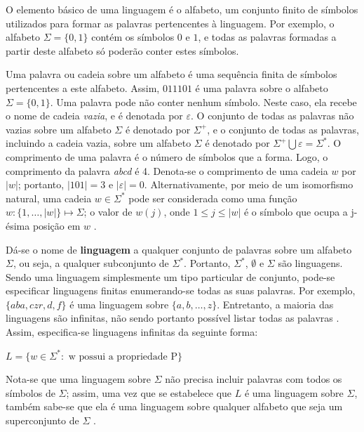 \documentclass[12pt,a4paper]{article}
\begin{document}
O elemento básico de uma linguagem é o alfabeto, um conjunto finito de símbolos
utilizados para formar as palavras pertencentes à linguagem. Por exemplo, o
alfabeto $\Sigma = \{0,1\}$ contém os símbolos $0$ e $1$, e todas as palavras
formadas a partir deste alfabeto só poderão conter estes símbolos.

Uma palavra ou cadeia sobre um alfabeto é uma sequência finita de símbolos
pertencentes a este alfabeto. Assim, $011101$ é uma palavra sobre o alfabeto
$\Sigma = \{0, 1\}$. Uma palavra pode não conter nenhum símbolo. Neste caso,
ela recebe o nome de cadeia \textit{vazia}, e é denotada por $\varepsilon$.
O conjunto de todas as palavras não vazias sobre um alfabeto $\Sigma$ é
denotado por $\Sigma^+$, e o conjunto de todas as palavras, incluindo
a cadeia vazia, sobre um alfabeto $\Sigma$ é denotado por
${\Sigma}^+ \bigcup \varepsilon = \Sigma^*$. O comprimento de uma palavra
é o número de símbolos que a forma. Logo, o comprimento da palavra
\emph{abcd} é 4. Denota-se o comprimento de uma cadeia $w$ por
$|w|$; portanto, $|101| = 3$ e $|\varepsilon| = 0$. Alternativamente,
por meio de um isomorfismo natural, uma cadeia $w \in \Sigma^*$ pode ser
considerada como uma função $w: \{1,\ldots,|w|\} \mapsto \Sigma$; o
valor de $w(j)$, onde $1 \le j \le |w|$ é o símbolo que ocupa a j-ésima
posição em $w$ .

Dá-se o nome de \textbf{linguagem} a qualquer conjunto de palavras sobre um
alfabeto $\Sigma$, ou seja, a qualquer subconjunto de $\Sigma^*$. Portanto,
$\Sigma^*$, $\emptyset$ e $\Sigma$ são linguagens. Sendo uma linguagem 
simplesmente um tipo particular de conjunto, pode-se especificar linguagens
finitas enumerando-se todas as suas palavras. Por exemplo, $\{aba, czr, d, f\}$
é uma linguagem sobre $\{a, b, \ldots, z\}$. Entretanto, a maioria das
linguagens são infinitas, não sendo portanto possível listar todas as palavras
. Assim, especifica-se linguagens infinitas da seguinte forma:

\begin{center}
$L = \{w \in \Sigma^*: \mbox{ w possui a propriedade P}\}$
\end{center}

Nota-se que uma linguagem sobre $\Sigma$ não precisa incluir palavras com todos
os símbolos de $\Sigma$; assim, uma vez que se estabelece que $L$ é uma
linguagem sobre $\Sigma$, também sabe-se que ela é uma linguagem sobre qualquer
alfabeto que seja um superconjunto de $\Sigma$ .
\end{document}
